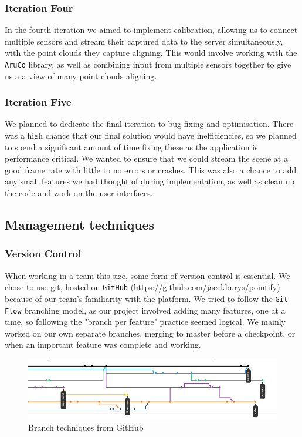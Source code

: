 \documentclass{article}
\begin{document}
\subsubsection{Iteration Four}
In the fourth iteration we aimed to implement calibration, allowing us to connect multiple sensors and stream their captured data to the server simultaneously, with the point clouds they capture aligning. This would involve working with the \texttt{AruCo} \cite{aruco} library, as well as combining input from multiple sensors together to give us a a view of many point clouds aligning.
\subsubsection{Iteration Five}
We planned to dedicate the final iteration to bug fixing and optimisation. There was a high chance that our final solution would have inefficiencies, so we planned to spend a significant amount of time fixing these as the application is performance critical. We wanted to ensure that we could stream the scene at a good frame rate with little to no errors or crashes. This was also a chance to add any small features we had thought of during implementation, as well as clean up the code and work on the user interfaces.

\newpage
\subsection{Management techniques}
\subsubsection{Version Control}
When working in a team this size, some form of version control is essential. We chose to use git, hosted on \texttt{GitHub} (https://github.com/jacekburys/pointify) because of our team's familiarity with the platform. We tried to follow the \texttt{Git Flow} \cite{gitflow} branching model, as our project involved adding many features, one at a time, so following the "branch per feature" practice seemed logical. We mainly worked on our own separate branches, merging to master before a checkpoint, or when an important feature was complete and working. 
\begin{figure}[h]
  \centering
  \includegraphics[scale=0.5]{github}
  \caption{Branch techniques from GitHub}
  \label{fig:github}
\end{figure}
\\
\end{document}
